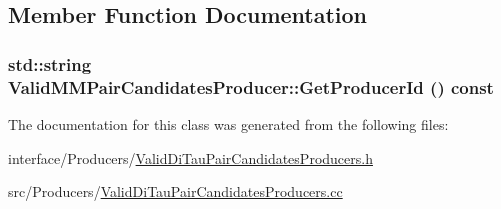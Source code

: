 \subsection{Member Function Documentation}
\hypertarget{classValidMMPairCandidatesProducer_a203cc2509b5cdc61f5867595d4bafae4}{
\subsubsection[{GetProducerId}]{\setlength{\rightskip}{0pt plus 5cm}std::string ValidMMPairCandidatesProducer::GetProducerId () const}}
\label{classValidMMPairCandidatesProducer_a203cc2509b5cdc61f5867595d4bafae4}


The documentation for this class was generated from the following files:\begin{DoxyCompactItemize}
\item 
interface/Producers/\hyperlink{ValidDiTauPairCandidatesProducers_8h}{ValidDiTauPairCandidatesProducers.h}\item 
src/Producers/\hyperlink{ValidDiTauPairCandidatesProducers_8cc}{ValidDiTauPairCandidatesProducers.cc}\end{DoxyCompactItemize}
